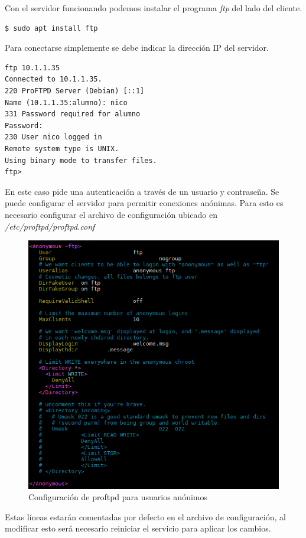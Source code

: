 \documentclass[12pt]{article}
\begin{document}
Con el servidor funcionando podemos instalar el programa \emph{ftp} del lado del cliente.

\begin{lstlisting}[frame=single]
$ sudo apt install ftp
\end{lstlisting}

Para conectarse simplemente se debe indicar la dirección IP del servidor.
\begin{lstlisting}[frame=single]
ftp 10.1.1.35
Connected to 10.1.1.35.
220 ProFTPD Server (Debian) [::1]
Name (10.1.1.35:alumno): nico
331 Password required for alumno
Password:
230 User nico logged in
Remote system type is UNIX.
Using binary mode to transfer files.
ftp>
\end{lstlisting}

En este caso pide una autenticación a través de un usuario y contraseña. Se puede configurar el servidor para permitir conexiones anónimas. Para esto es necesario configurar el archivo de configuración ubicado en \emph{/etc/proftpd/proftpd.conf}

\begin{figure}[!h]
   \centering
   \includegraphics[scale=.39]{imgs/ftp_conf.PNG}
   \caption{Configuración de proftpd para usuarios anónimos}
   \label{fig8}
\end{figure}
Estas líneas estarán comentadas por defecto en el archivo de configuración, al modificar esto será necesario reiniciar el servicio para aplicar los cambios.
\end{document}
